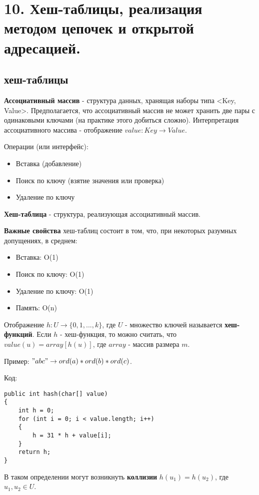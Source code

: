 \section*{10. Хеш-таблицы, реализация методом цепочек и открытой адресацией.}

\subsection*{хеш-таблицы}

{\bf Ассоциативный массив} - структура данных, хранящая наборы типа <Key, Value>. 
Предполагается, что ассоциативный массив не может хранить две пары с одинаковыми ключами (на практике этого добиться сложно).
Интерпретация ассоциативного массива - отображение $value: Key \rightarrow Value$.

Операции (или интерфейс):
\begin{itemize}
\item Вставка (добавление)
\item Поиск по ключу (взятие значения или проверка)
\item Удаление по ключу
\end{itemize}

{\bf Хеш-таблица} - структура, реализующая ассоциативный массив.

{\bf Важные свойства} хеш-таблиц состоит в том, что, при некоторых разумных допущениях, в среднем:
\begin{itemize}
\item Вставка: O(1)
\item Поиск по ключу: O(1)
\item Удаление по ключу: O(1)
\item Память: O(n)
\end{itemize}

Отображение $h: U \rightarrow \{0, 1, ..., k\}$, где $U$ - множество ключей называется {\bf хеш-функций}.
Если $h$ - хеш-функция, то можно считать, что $value(u) = array[h(u)]$, где $array$ - массив размера $m$.

Пример:
$"abc" \rightarrow ord(a)*ord(b)*ord(c)$.

Код:
\begin{verbatim}
public int hash(char[] value) 
{
	int h = 0;
	for (int i = 0; i < value.length; i++) 
	{
		h = 31 * h + value[i];
	}
	return h;
}
\end{verbatim}

В таком определении могут возникнуть {\bf коллизии} $h(u_1) = h(u_2)$, где $u_1, u_2 \in U$.


